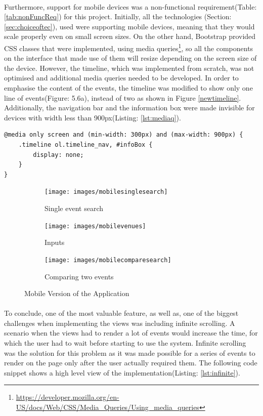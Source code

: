 \documentclass{l4proj}
\begin{document}
\paragraph{}
Furthermore, support for mobile devices was a non-functional requirement(Table: \ref{tab:nonFuncReq}) for this project. Initially, all the technologies (Section: \ref{sec:choiceoftec}), used were supporting mobile devices, meaning that they would scale properly even on small screen sizes. On the other hand, Bootstrap provided CSS classes that were implemented, using media queries\footnote{\url{https://developer.mozilla.org/en-US/docs/Web/CSS/Media_Queries/Using_media_queries}}, so all the components on the interface that made use of them will resize depending on the screen size of the device. However, the timeline, which was implemented from scratch, was not optimised and additional media queries needed to be developed. In order to emphasise the content of the events, the timeline was modified to show only one line of events(Figure: 5.6a), instead of two as shown in Figure \ref{newtimeline}. Additionally, the navigation bar and the information box were made invisible for devices with width less than 900px(Listing: \ref{lst:mediaq}). 
\begin{lstlisting}[caption={Media queries},label={lst:mediaq}]
@media only screen and (min-width: 300px) and (max-width: 900px) {
	.timeline ol.timeline_nav, #infoBox {
		display: none;
	}
}
\end{lstlisting}

\begin{figure}[H]
	\centering
	\begin{subfigure}{.25\textwidth}
		\texttt{[image: images/mobilesinglesearch]}
		\caption{Single event search}
		\label{mobversion1}
	\end{subfigure}
	\begin{subfigure}{.25\textwidth}
		\texttt{[image: images/mobilevenues]}
		\caption{Inputs}
		\label{mobversion2}
	\end{subfigure}
	\begin{subfigure}{.25\textwidth}
		\texttt{[image: images/mobilecomparesearch]}
		\caption{Comparing two events}
		\label{mobversion3}
	\end{subfigure}
		\caption{Mobile Version of the Application}
\end{figure}

\paragraph{}
To conclude, one of the most valuable feature, as well as, one of the biggest challenges when implementing the views was including infinite scrolling. A scenario when the views had to render a lot of events would increase the time, for which the user had to wait before starting to use the system. Infinite scrolling was the solution for this problem as it was made possible for a series of events to render on the page only after the user actually required them. The following code snippet shows a high level view of the implementation(Listing: \ref{lst:infinite}).
\end{document}
